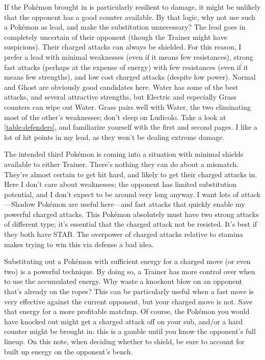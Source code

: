 If the Pokémon brought in is particularly resilient to damage, it might be unlikely that
 the opponent has a good counter available.
By that logic, why not use such a Pokémon as lead, and make the substitution unnecessary?
The lead goes in completely uncertain of their opponent (though the Trainer might have suspicions).
Their charged attacks can always be shielded.
For this reason, I prefer a lead with minimal weaknesses (even if it means few resistances),
 strong fast attacks (perhaps at the expense of energy) with few resistances (even if it means
 few strengths), and low cost charged attacks (despite low power). 
Normal and Ghost are obviously good candidates here.
Water has some of the best attacks, and several attractive strengths, but Electric and
 especially Grass counters can wipe out Water.
Grass pairs well with Water, the two eliminating most of the other's weaknesses;
 don't sleep on Ludicolo.
Take a look at \autoref{table:defenders}, and familiarize yourself with the first
 and second pages.
I like a lot of hit points in my lead, as they won't be dealing extreme damage.

The intended third Pokémon is coming into a situation with minimal shields available
 to either Trainer.
There's nothing they can do about a mismatch.
They're almost certain to get hit hard, and likely to get their charged attacks in.
Here I don't care about weaknesses; the opponent has limited substitution potential,
 and I don't expect to be around very long anyway.
I want lots of attack---Shadow Pokémon are useful here---and fast attacks that quickly enable my powerful charged attacks.
This Pokémon absolutely must have two strong attacks of different type; it's essential that the charged attack not be resisted.
It's best if they both have STAB\@.
The overpower of charged attacks relative to stamina makes trying to win this via defense a bad idea.

Substituting out a Pokémon with sufficient energy for a charged move (or even two) is a powerful technique.
By doing so, a Trainer has more control over when to use the accumulated energy.
Why waste a knockout blow on an opponent that's already on the ropes?
This can be particularly useful when a fast move is very effective against the current opponent,
 but your charged move is not.
Save that energy for a more profitable matchup.
Of course, the Pokémon you would have knocked out might get a charged attack off on your sub,
 and/or a hard counter might be brought in:
 this is a gamble until you know the opponent's full lineup.
On this note, when deciding whether to shield, be sure to account for built up energy on the opponent's bench.

